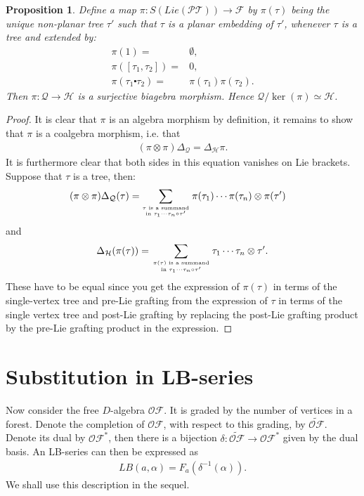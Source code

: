 \documentclass[10pt,a4paper]{article}
\newtheorem{proposition}[theorem]{Proposition}
\begin{document}
\begin{proposition}
Define a map $\pi: S(Lie(\mathcal{PT}))\to \mathcal{F}$ by $\pi(\tau)$ being the unique non-planar tree $\tau'$ such that $\tau$ is a planar embedding of $\tau'$, whenever $\tau$ is a tree and extended by:
\begin{align*}
\pi(1)=&\emptyset,\\
\pi([\tau_1,\tau_2])=&0, \\
\pi(\tau_1 \centerdot \tau_2)=&\pi(\tau_1)\pi(\tau_2).
\end{align*}
Then $\pi: \mathcal{Q} \to \mathcal{H}$ is a surjective biagebra morphism. Hence $\mathcal{Q}/\ker(\pi) \simeq \mathcal{H}$.
\end{proposition}
\begin{proof}
It is clear that $\pi$ is an algebra morphism by definition, it remains to show that $\pi$ is a coalgebra morphism, i.e. that
\begin{align*}
(\pi \otimes \pi)\Delta_{\mathcal{Q}}=\Delta_{\mathcal{H}}\pi.
\end{align*}
It is furthermore clear that both sides in this equation vanishes on Lie brackets. Suppose that $\tau$ is a tree, then:
\begin{align*}
(\pi \otimes \pi)\Delta_{\mathcal{Q}}(\tau)=&\sum_{\tau \text{ is a summand} \atop \text{in } \tau_1\cdots \tau_n \circ \tau'} \pi(\tau_1)\cdots\pi(\tau_n) \otimes \pi(\tau')
\end{align*}
and
\begin{align*}
\Delta_{\mathcal{H}}(\pi(\tau))=\sum_{\pi(\tau) \text{ is a summand} \atop \text{in } \tau_1 \cdots \tau_n \circ \tau'} \tau_1 \cdots \tau_n \otimes \tau'.
\end{align*}
These have to be equal since you get the expression of $\pi(\tau)$ in terms of the single-vertex tree and pre-Lie grafting from the expression of $\tau$ in terms of the single vertex tree and post-Lie grafting by replacing the post-Lie grafting product by the pre-Lie grafting product in the expression.
\end{proof}


\section{Substitution in LB-series} 
\label{section::5}

Now consider the free $D$-algebra $\mathcal{OF}$. It is graded by the number of vertices in a forest. Denote the completion of $\mathcal{OF}$, with respect to this grading, by $\widetilde{\mathcal{OF}}$. Denote its dual by $\mathcal{OF}^{\ast}$, then there is a bijection $\delta:\widetilde{\mathcal{OF}} \to \mathcal{OF}^{\ast}$ given by the dual basis. An LB-series can then be expressed as
\begin{align*}
LB(a,\alpha)=F_a(\delta^{-1}(\alpha)).
\end{align*}
We shall use this description in the sequel.
\end{document}
